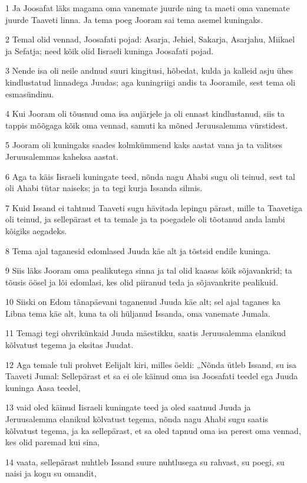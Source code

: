 \par 1 Ja Joosafat läks magama oma vanemate juurde ning ta maeti oma vanemate juurde Taaveti linna. Ja tema poeg Jooram sai tema asemel kuningaks.
\par 2 Temal olid vennad, Joosafati pojad: Asarja, Jehiel, Sakarja, Asarjahu, Miikael ja Sefatja; need kõik olid Iisraeli kuninga Joosafati pojad.
\par 3 Nende isa oli neile andnud suuri kingitusi, hõbedat, kulda ja kalleid asju ühes kindlustatud linnadega Juudas; aga kuningriigi andis ta Jooramile, sest tema oli esmasündinu.
\par 4 Kui Jooram oli tõusnud oma isa aujärjele ja oli ennast kindlustanud, siis ta tappis mõõgaga kõik oma vennad, samuti ka mõned Jeruusalemma vürstidest.
\par 5 Jooram oli kuningaks saades kolmkümmend kaks aastat vana ja ta valitses Jeruusalemmas kaheksa aastat.
\par 6 Aga ta käis Iisraeli kuningate teed, nõnda nagu Ahabi sugu oli teinud, sest tal oli Ahabi tütar naiseks; ja ta tegi kurja Issanda silmis.
\par 7 Kuid Issand ei tahtnud Taaveti sugu hävitada lepingu pärast, mille ta Taavetiga oli teinud, ja sellepärast et ta temale ja ta poegadele oli tõotanud anda lambi kõigiks aegadeks.
\par 8 Tema ajal taganesid edomlased Juuda käe alt ja tõstsid endile kuninga.
\par 9 Siis läks Jooram oma pealikutega sinna ja tal olid kaasas kõik sõjavankrid; ta tõusis öösel ja lõi edomlasi, kes olid piiranud teda ja sõjavankrite pealikuid.
\par 10 Siiski on Edom tänapäevani taganenud Juuda käe alt; sel ajal taganes ka Libna tema käe alt, kuna ta oli hüljanud Issanda, oma vanemate Jumala.
\par 11 Temagi tegi ohvrikünkaid Juuda mäestikku, saatis Jeruusalemma elanikud kõlvatust tegema ja eksitas Juudat.
\par 12 Aga temale tuli prohvet Eelijalt kiri, milles öeldi: „Nõnda ütleb Issand, su isa Taaveti Jumal: Sellepärast et sa ei ole käinud oma isa Joosafati teedel ega Juuda kuninga Aasa teedel,
\par 13 vaid oled käinud Iisraeli kuningate teed ja oled saatnud Juuda ja Jeruusalemma elanikud kõlvatust tegema, nõnda nagu Ahabi sugu saatis kõlvatust tegema, ja ka sellepärast, et sa oled tapnud oma isa perest oma vennad, kes olid paremad kui sina,
\par 14 vaata, sellepärast nuhtleb Issand suure nuhtlusega su rahvast, su poegi, su naisi ja kogu su omandit,
